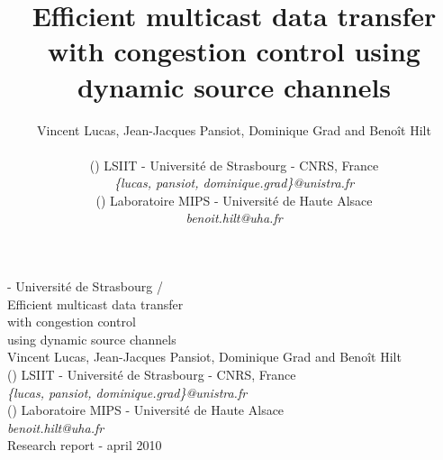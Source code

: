 \documentclass[a4paper]{article}
\begin{document}
    \begin{center}
        {\large
             - Universit\'e de Strasbourg / 
            \\
            \vspace{4cm}
            {\huge
                Efficient multicast data transfer\\
                    with congestion control\\
                    using dynamic source channels
            }
            \\
            \vspace{2cm}
            {\Large
                Vincent Lucas,
                Jean-Jacques Pansiot,
                Dominique Grad
                and Beno\^it Hilt
            }
            \\
            \vspace{1cm}
            () LSIIT - Universit\'e de Strasbourg - CNRS, France\\
            \textit{\{lucas, pansiot, dominique.grad\}@unistra.fr}\\
            () Laboratoire MIPS - Universit\'e de Haute Alsace\\
            \textit{benoit.hilt@uha.fr}
            \\
            \vspace{5cm}
            {\Large
                Research report -  april 2010
            }
        }
    \end{center}
    \newpage

\title{
    Efficient multicast data transfer with congestion control using dynamic
        source channels
}

\author{Vincent Lucas,
    Jean-Jacques Pansiot,
    Dominique Grad
    and Beno\^it Hilt
    \\
    \\
    () LSIIT - Universit\'e de Strasbourg - CNRS, France\\
    \textit{\{lucas, pansiot, dominique.grad\}@unistra.fr}\\
    () Laboratoire MIPS - Universit\'e de Haute Alsace\\
    \textit{benoit.hilt@uha.fr}
}

\maketitle
\end{document}
